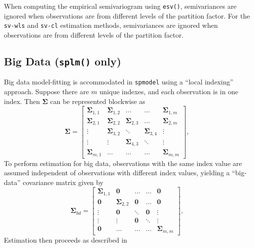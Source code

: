 \documentclass[10pt,letterpaper]{article}
\begin{document}
When computing the empirical semivariogram using \texttt{esv()},
semivariances are ignored when observations are from different levels of
the partition factor. For the \texttt{sv-wls} and \texttt{sv-cl}
estimation methods, semivariances are ignored when observations are from
different levels of the partition factor.

\hypertarget{subsec:bigdata}{%
\subsection{\texorpdfstring{Big Data (\texttt{splm()}
only)}{Big Data (splm() only)}}\label{subsec:bigdata}}

Big data model-fitting is accommodated in \texttt{spmodel} using a
``local indexing'' approach. Suppose there are \(m\) unique indexes, and
each observation is in one index. Then \(\boldsymbol{\Sigma}\) can be
represented blockwise as \begin{equation}\label{eq:full_cov}
  \boldsymbol{\Sigma} = 
  \begin{bmatrix}
  \boldsymbol{\Sigma}_{1,1} & \boldsymbol{\Sigma}_{1,2} & \hdots & \hdots & \boldsymbol{\Sigma}_{1,m} \\
  \boldsymbol{\Sigma}_{2,1} & \boldsymbol{\Sigma}_{2,2} & \boldsymbol{\Sigma}_{2,3} & \hdots & \boldsymbol{\Sigma}_{2,m} \\
  \vdots & \boldsymbol{\Sigma}_{3,2} & \ddots & \boldsymbol{\Sigma}_{3,4} & \vdots \\
  \vdots & \vdots & \boldsymbol{\Sigma}_{4,3} & \ddots & \vdots \\
  \boldsymbol{\Sigma}_{m,1} & \hdots & \hdots & \hdots & \boldsymbol{\Sigma}_{m, m}
  \end{bmatrix},
\end{equation} To perform estimation for big data, observations with the
same index value are assumed independent of observations with different
index values, yielding a ``big-data'' covariance matrix given by
\begin{equation}\label{eq:bd_cov}
  \boldsymbol{\Sigma}_{bd} = 
  \begin{bmatrix}
  \boldsymbol{\Sigma}_{1,1} & \boldsymbol{0} & \hdots & \hdots & \boldsymbol{0} \\
  \boldsymbol{0} & \boldsymbol{\Sigma}_{2,2} & \boldsymbol{0} & \hdots & \boldsymbol{0} \\
  \vdots & \boldsymbol{0} & \ddots & \boldsymbol{0} & \vdots \\
  \vdots & \vdots & \boldsymbol{0} & \ddots & \vdots \\
  \boldsymbol{0} & \hdots & \hdots & \hdots & \boldsymbol{\Sigma}_{m, m}
  \end{bmatrix},
\end{equation} Estimation then proceeds as described in
\end{document}
